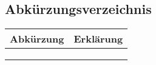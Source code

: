 \subsection{Abkürzungsverzeichnis}

\begin{tabularx}{\textwidth}{| >{\scriptsize}p{4cm} | >{\scriptsize}X |}
    \hline
    \rowcolor{lightgray} 
    Abkürzung               & Erklärung \\ \hline
    & \\ \hline
    & \\ \hline
    & \\ \hline
\end{tabularx}
